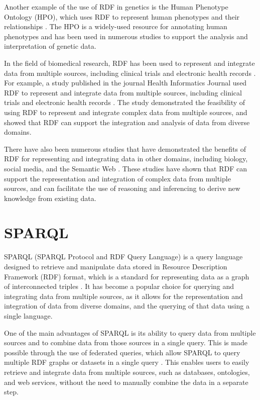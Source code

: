 Another example of the use of RDF in genetics is the Human Phenotype Ontology (HPO), which uses RDF to represent human phenotypes and their relationships \citep{robinson2010human}.  The HPO is a widely-used resource for annotating human phenotypes and has been used in numerous studies to support the analysis and interpretation of genetic data.

In the field of biomedical research, RDF has been used to represent and integrate data from multiple sources, including clinical trials and electronic health records \citep{luz2015providing}.  For example, a study published in the journal Health Informatics Journal used RDF to represent and integrate data from multiple sources, including clinical trials and electronic health records \citep{luz2015providing}.  The study demonstrated the feasibility of using RDF to represent and integrate complex data from multiple sources, and showed that RDF can support the integration and analysis of data from diverse domains.

There have also been numerous studies that have demonstrated the benefits of RDF for representing and integrating data in other domains, including biology, social media, and the Semantic Web \citep{schreiber2014rdf,allemang2011semantic,heath2011linked}.  These studies have shown that RDF can support the representation and integration of complex data from multiple sources, and can facilitate the use of reasoning and inferencing to derive new knowledge from existing data.

\section{SPARQL}

SPARQL (SPARQL Protocol and RDF Query Language) is a query language designed to retrieve and manipulate data stored in Resource Description Framework (RDF) format, which is a standard for representing data as a graph of interconnected triples \citep{prud2008sparql}.  It has become a popular choice for querying and integrating data from multiple sources, as it allows for the representation and integration of data from diverse domains, and the querying of that data using a single language.

One of the main advantages of SPARQL is its ability to query data from multiple sources and to combine data from those sources in a single query.  This is made possible through the use of federated queries, which allow SPARQL to query multiple RDF graphs or datasets in a single query \citep{allemang2011semantic,rakhmawati2013querying}.  This enables users to easily retrieve and integrate data from multiple sources, such as databases, ontologies, and web services, without the need to manually combine the data in a separate step.

